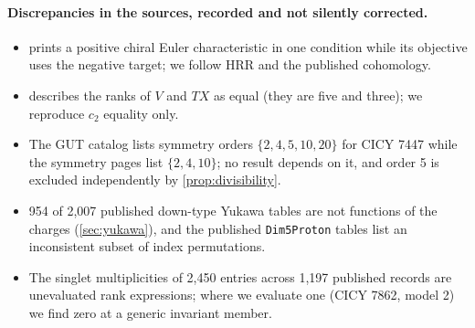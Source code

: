\paragraph{Discrepancies in the sources, recorded and not silently corrected.}
\begin{itemize}[leftmargin=*]
\item \cite{ACHLN2023} prints a positive chiral Euler characteristic in one
  condition while its objective uses the negative target; we follow HRR and the
  published cohomology.
\item \cite[Sec.~7]{ACGLP2013} describes the ranks of $V$ and $TX$ as equal
  (they are five and three); we reproduce $c_2$ equality only.
\item The GUT catalog lists symmetry orders $\{2,4,5,10,20\}$ for CICY 7447
  while the symmetry pages list $\{2,4,10\}$; no result depends on it, and order
  5 is excluded independently by \cref{prop:divisibility}.
\item 954 of 2,007 published down-type Yukawa tables are not functions of the
  charges (\cref{sec:yukawa}), and the published \texttt{Dim5Proton} tables list
  an inconsistent subset of index permutations.
\item The singlet multiplicities of 2,450 entries across 1,197 published records
  are unevaluated rank expressions; where we evaluate one (CICY 7862, model 2) we
  find zero at a generic invariant member.
\end{itemize}
